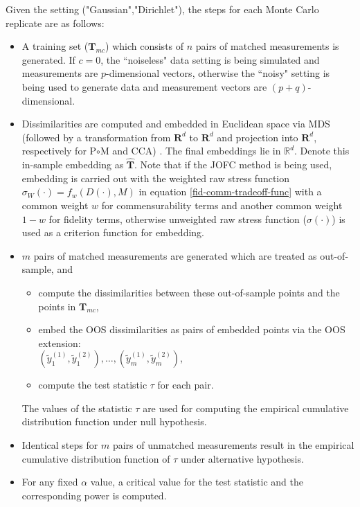 \documentclass[11pt]{article} %
\begin{document}
Given the setting ("Gaussian","Dirichlet"),   the steps for each Monte Carlo replicate are as follows:
\begin{itemize}
\item A training set ($\mathbf{T}_{mc}$) which consists of  $n$ pairs of matched measurements is generated.  If $c=0$, the ``noiseless" data setting is being simulated and measurements are $p$-dimensional vectors, otherwise  the ``noisy" setting is being used to generate data and measurement vectors are $(p+q)$-dimensional.
\item Dissimilarities are computed and embedded in  Euclidean space  via MDS (followed by a transformation from  $\mathbf{R}^d$ to  $\mathbf{R}^d$ and  projection into $\mathbf{R}^d$, respectively  for P$\circ$M and CCA) . The final embeddings lie in $\mathbb{R}^d$.   Denote this in-sample embedding as   $\hat{\mathbf{T}}$. Note that  if the JOFC method is being used, embedding is carried out with the weighted raw stress function $\sigma_{W}(\cdot)=f_{w}(D(\cdot),M)$ in equation \eqref{fid-comm-tradeoff-func} with a common weight $w$ for commensurability terms and another common weight $1-w$ for fidelity terms, otherwise unweighted raw stress function ($\sigma(\cdot)$) is used as a criterion function for embedding.

\item  $m$ pairs of matched   measurements are generated which are treated as out-of-sample, and 
\begin{itemize}
\item compute the dissimilarities  %
 between these out-of-sample  points and the points in ${\mathbf{T}_{mc}}$,  
\item  embed the OOS dissimilarities as pairs of embedded points via the OOS extension:\\
 $(\tilde{y}_1^{(1)},\tilde{y}_1^{(2)}),\ldots, (\tilde{y}_m^{(1)},\tilde{y}_m^{(2)})$, 
\item compute the test statistic $\tau$ for each pair.%
\end{itemize}
 The values of the statistic $\tau$ are used for computing  the empirical cumulative distribution function under null hypothesis. 

\item Identical steps for $m$ pairs of unmatched measurements result in the empirical cumulative distribution  function of $\tau$ under alternative hypothesis.
\item For any fixed $\alpha$ value, a critical value for the test statistic and the corresponding power is computed.
\end{itemize}
\end{document}
